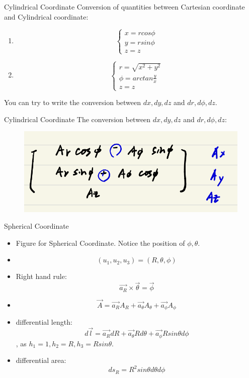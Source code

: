 \documentclass[xcolor={dvipsnames}]{beamer}
\begin{document}
\begin{frame}{Cylindrical Coordinate}
Conversion of quantities between Cartesian coordinate and Cylindrical coordinate:
    \begin{enumerate}
   
        \item
        $$
        \begin{cases}
            x = rcos\phi\\
            y = rsin\phi\\
            z = z
        \end{cases}
        $$
        \item
        $$
        \begin{cases}
            r= \sqrt{x^2 + y^2}\\
            \phi = arctan \frac{y}{x}\\
            z = z
        \end{cases}
        $$
    \end{enumerate}
You can try to write the conversion between $dx,dy,dz$ and $dr,d\phi,dz$.
\end{frame}
\begin{frame}{Cylindrical Coordinate}
The conversion between $dx,dy,dz$ and $dr,d\phi,dz$:
\begin{figure}
	\centering
	\includegraphics[width=0.7\linewidth]{1.png}
\end{figure}
\end{frame}
\begin{frame}{Spherical Coordinate}
\begin{itemize}
    \item Figure for Spherical Coordinate. Notice the position of $\phi, \theta$.
    \item
    $$
    (u_1, u_2, u_3) = (R, \theta, \phi)
    $$
    \item Right hand rule: 
    $$
    \vec{a_R} \times \vec{\theta} = \vec{\phi}
    $$
    \item $$
    \vec{A} = \vec{a_R}A_R + \vec{a_\theta}A_\theta + \vec{a_\phi}A_\phi
    $$
    \item differential length:
    \begin{equation}\label{Eq: spherical-differential-length}
        d\vec{l} = \vec{a_R}dR + \vec{a_\theta}Rd\theta + \vec{a_\phi}Rsin\theta d\phi
    \end{equation}, as $h_1 = 1, h_2 = R, h_3 = Rsin\theta$.
    \item differential area:
    $$
    ds_R = R^2sin\theta d\theta d\phi
    $$
\end{itemize}
\end{frame}
\end{document}

